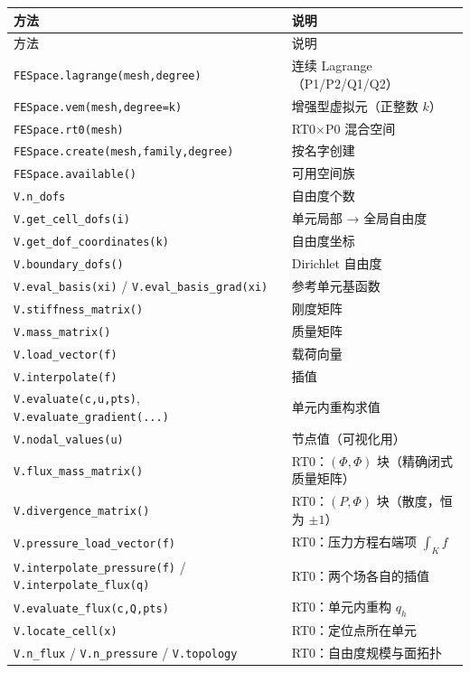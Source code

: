 \documentclass[UTF8,11pt,oneside]{ctexbook}
\theoremstyle{definition}
\theoremstyle{plain}
\newcommand{\code}[1]{\texttt{#1}}
\begin{document}
\begingroup\small
\begin{longtable}{@{}L{5.0cm}L{9.4cm}@{}}
\toprule
方法 & 说明 \\
\midrule
\endfirsthead
\toprule
方法 & 说明 \\
\midrule
\endhead
\code{FESpace.lagrange(mesh,\allowbreak  degree)} & 连续 Lagrange（P1/P2/Q1/Q2） \\
\code{FESpace.vem(mesh,\allowbreak  degree=k)} & 增强型虚拟元（正整数 $k$） \\
\code{FESpace.rt0(mesh)} & RT0$\times$P0 混合空间 \\
\code{FESpace.create(mesh,\allowbreak  family,\allowbreak  degree)} & 按名字创建 \\
\code{FESpace.available()} & 可用空间族 \\
\code{V.n\_\allowbreak dofs} & 自由度个数 \\
\code{V.get\_\allowbreak cell\_\allowbreak dofs(i)} & 单元局部 → 全局自由度 \\
\code{V.get\_\allowbreak dof\_\allowbreak coordinates(k)} & 自由度坐标 \\
\code{V.boundary\_\allowbreak dofs()} & Dirichlet 自由度 \\
\code{V.eval\_\allowbreak basis(xi)} / \code{V.eval\_\allowbreak basis\_\allowbreak grad(xi)} & 参考单元基函数 \\
\code{V.stiffness\_\allowbreak matrix()} & 刚度矩阵 \\
\code{V.mass\_\allowbreak matrix()} & 质量矩阵 \\
\code{V.load\_\allowbreak vector(f)} & 载荷向量 \\
\code{V.interpolate(f)} & 插值 \\
\code{V.evaluate(c,\allowbreak  u,\allowbreak  pts)}, \code{V.evaluate\_\allowbreak gradient(...)} & 单元内重构求值 \\
\code{V.nodal\_\allowbreak values(u)} & 节点值（可视化用） \\
\midrule
\code{V.flux\_\allowbreak mass\_\allowbreak matrix()} & RT0：$(\Phi,\Phi)$ 块（精确闭式质量矩阵） \\
\code{V.divergence\_\allowbreak matrix()} & RT0：$(P,\Phi)$ 块（散度，恒为 $\pm1$） \\
\code{V.pressure\_\allowbreak load\_\allowbreak vector(f)} & RT0：压力方程右端项 $\int_K f$ \\
\code{V.interpolate\_\allowbreak pressure(f)} / \code{V.interpolate\_\allowbreak flux(q)} & RT0：两个场各自的插值 \\
\code{V.evaluate\_\allowbreak flux(c,\allowbreak  Q,\allowbreak  pts)} & RT0：单元内重构 $q_h$ \\
\code{V.locate\_\allowbreak cell(x)} & RT0：定位点所在单元 \\
\code{V.n\_\allowbreak flux} / \code{V.n\_\allowbreak pressure} / \code{V.topology} & RT0：自由度规模与面拓扑 \\
\bottomrule
\end{longtable}
\endgroup
\end{document}
